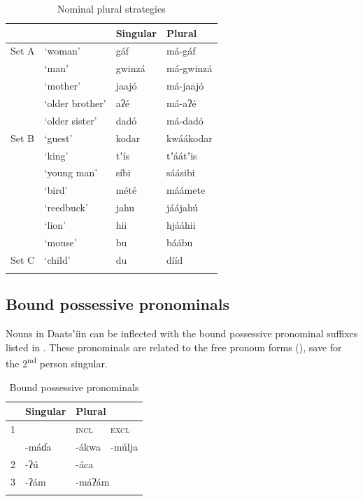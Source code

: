 \documentclass[output=paper]{langsci/langscibook}
\begin{document}
\begin{table}

\begin{tabularx}{\textwidth}{XXXX}
\lsptoprule
\multicolumn{1}{X}{} &  & Singular & \multicolumn{1}{X}{Plural}\\
\midrule
 Set A & ‘woman’ &  gáf &  má-gáf \\
& ‘man’ &  gwinzá &  má-gwinzá  \\
& ‘mother' &  jaaj\'{o} &  má-jaaj\'{o}\\
& ‘older brother' & aʔé &  má-aʔé\\
& ‘older sister' & dad\'{o} &  má-dad\'{o}\\
Set B & ‘guest’ &  kodar &  kwáákodar\\
& ‘king’ &  tʼís &  tʼáátʼis\\
& ‘young man' &  síbi &  sáásibi\\
& ‘bird' &  mété &  máámete\\
& ‘reedbuck' &  jahu &  jáájah\'{u}\\
& ‘lion' &  hii &  hjááhii \\
& ‘mouse’ &  bu & báábu\\
Set C & ‘child' &  du &  dííd\\
\lspbottomrule
\end{tabularx}
\caption{Nominal plural strategies}
\label{tab:ahlandc:6}
\end{table}


\subsection{Bound possessive pronominals}\label{sec:ahlandc:7.2}


Nouns in Daatsʼíin can be inflected with the bound possessive pronominal suffixes listed in . These pronominals are related to the free pronoun forms (), save for the 2\textsuperscript{nd} person singular. 


\begin{table}

\begin{tabularx}{\textwidth}{XXXX}
\lsptoprule 
&  Singular & \multicolumn{2}{X}{Plural}\\
\midrule
 1 &   & \scshape incl & \scshape excl\\
& {}-máɗa &  {}-ákwa & {}-m\'{u}lja\\
 2 &  {}-ʔ\'{u} & \multicolumn{2}{X}{{}-áca}\\
 3 &  {}-ʔám & \multicolumn{2}{X}{{}-máʔám}\\
\lspbottomrule
\end{tabularx}
\caption{Bound possessive pronominals}
\label{tab:ahlandc:7}
\end{table}
\end{document}
